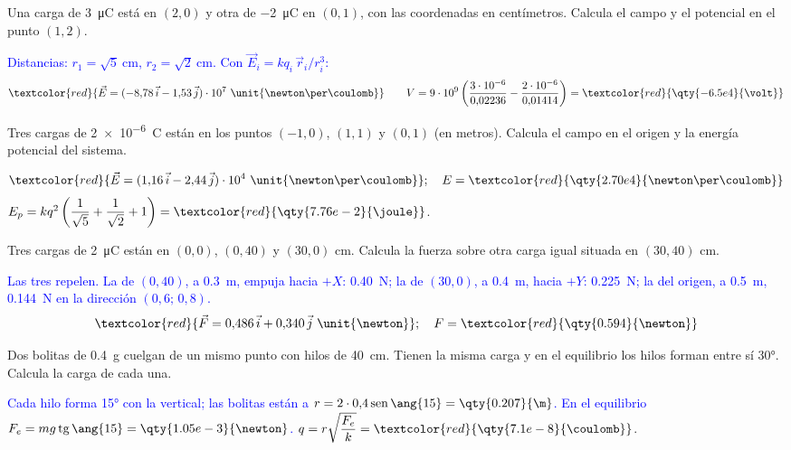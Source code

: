 \begin{exercise}
    Una carga de \qty{3}{\micro\coulomb} está en \((2, 0)\) y otra de \qty{-2}{\micro\coulomb} en \((0, 1)\), con las coordenadas en
    centímetros. Calcula el campo y el potencial en el punto \((1, 2)\).
    \begin{solu}
        \textcolor{blue}{Distancias: \(r_1 = \sqrt 5\ \unit{\cm}\), \(r_2 = \sqrt 2\ \unit{\cm}\). Con \(\vec E_i = k q_i\,\vec r_i/r_i^3\):}
        \[ \textcolor{red}{\vec E = (-8{,}78\,\vec{i} - 1{,}53\,\vec{j})\cdot 10^7\ \unit{\newton\per\coulomb}} \qquad
           V = 9\cdot 10^9\left(\dfrac{3\cdot 10^{-6}}{0{,}02236} - \dfrac{2\cdot 10^{-6}}{0{,}01414}\right) = \textcolor{red}{\qty{-6.5e4}{\volt}} \]
    \end{solu}
\end{exercise}

\begin{exercise}
    Tres cargas de \qty{2e-6}{\coulomb} están en los puntos \((-1, 0)\), \((1, 1)\) y \((0, 1)\) (en metros). Calcula el campo en el
    origen y la energía potencial del sistema.
    \begin{solu}
        \[ \textcolor{red}{\vec E = (1{,}16\,\vec{i} - 2{,}44\,\vec{j})\cdot 10^4\ \unit{\newton\per\coulomb}};\quad E = \textcolor{red}{\qty{2.70e4}{\newton\per\coulomb}} \]
        \(E_p = k q^2\left(\dfrac{1}{\sqrt 5} + \dfrac{1}{\sqrt 2} + 1\right) = \textcolor{red}{\qty{7.76e-2}{\joule}}\).
    \end{solu}
\end{exercise}

\begin{exercise}
    Tres cargas de \qty{2}{\micro\coulomb} están en \((0, 0)\), \((0, 40)\) y \((30, 0)\) cm. Calcula la fuerza sobre otra carga igual
    situada en \((30, 40)\) cm.
    \begin{solu}
        \textcolor{blue}{Las tres repelen. La de \((0, 40)\), a \qty{0.3}{\m}, empuja hacia \(+X\): \qty{0.40}{\newton}; la de \((30, 0)\), a \qty{0.4}{\m},
        hacia \(+Y\): \qty{0.225}{\newton}; la del origen, a \qty{0.5}{\m}, \qty{0.144}{\newton} en la dirección \((0{,}6;\,0{,}8)\).}
        \[ \textcolor{red}{\vec F = 0{,}486\,\vec{i} + 0{,}340\,\vec{j}\ \unit{\newton}};\quad F = \textcolor{red}{\qty{0.594}{\newton}} \]
    \end{solu}
\end{exercise}

\begin{exercise}
    Dos bolitas de \qty{0.4}{\g} cuelgan de un mismo punto con hilos de \qty{40}{\cm}. Tienen la misma carga y en el equilibrio
    los hilos forman entre sí \ang{30}. Calcula la carga de cada una.
    \begin{solu}
        \textcolor{blue}{Cada hilo forma \ang{15} con la vertical; las bolitas están a \(r = 2\cdot 0{,}4\sen\ang{15} = \qty{0.207}{\m}\).
        En el equilibrio \(F_e = mg\tg\ang{15} = \qty{1.05e-3}{\newton}\).}
        \(q = r\sqrt{\dfrac{F_e}{k}} = \textcolor{red}{\qty{7.1e-8}{\coulomb}}\).
    \end{solu}
\end{exercise}

